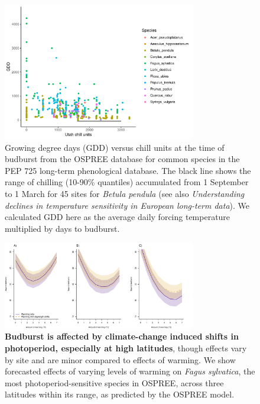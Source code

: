 \documentclass{article}
\begin{document}
\newpage
\begin{figure}[h!]
\centering
\noindent \includegraphics[width=0.75\textwidth]{..//..//analyses/bb_analysis/figures/gddbyutah_pepspp.pdf}
\caption{Growing degree days (GDD) versus chill units at the time of budburst from the OSPREE database for common species in the PEP 725 long-term phenological database. The black line shows the range of chilling (10-90\% quantiles) accumulated from 1 September to 1 March for 45 sites for \emph{Betula pendula} (see also \emph{Understanding declines in temperature sensitivity in European long-term data}). We calculated GDD here as the average daily forcing temperature multiplied by days to budburst. }
\label{fig:pepgddchill}
\end{figure}
\newpage

\begin{figure}[h!]
\centering
\noindent \includegraphics[width=0.75\textwidth]{..//..//analyses/bb_analysis/figures/forecasting/fagsyl_3lats.pdf}
\caption{\textbf{Budburst is affected by climate-change induced shifts in photoperiod, especially at high latitudes}, though effects vary by site and are minor compared to effects of warming. We show forecasted effects of varying levels of warming on \emph{Fagus sylvatica}, the most photoperiod-sensitive species in OSPREE, across three latitudes within its range, as predicted by the OSPREE model.}
\label{fig:fagsyllat}
\end{figure}


\end{document}
